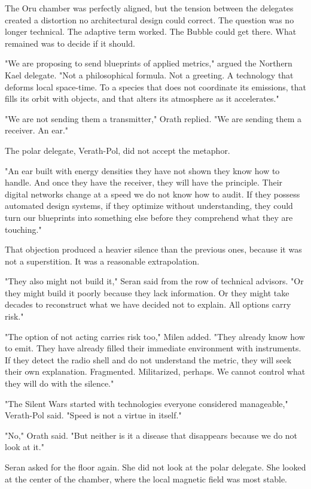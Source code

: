 \documentclass[11pt,a5paper,twoside]{book}
\begin{document}
The Oru chamber was perfectly aligned, but the tension between the delegates created a distortion no architectural design could correct. The question was no longer technical. The adaptive term worked. The Bubble could get there. What remained was to decide if it should.

"We are proposing to send blueprints of applied metrics," argued the Northern Kael delegate. "Not a philosophical formula. Not a greeting. A technology that deforms local space-time. To a species that does not coordinate its emissions, that fills its orbit with objects, and that alters its atmosphere as it accelerates."

"We are not sending them a transmitter," Orath replied. "We are sending them a receiver. An ear."

The polar delegate, Verath-Pol, did not accept the metaphor.

"An ear built with energy densities they have not shown they know how to handle. And once they have the receiver, they will have the principle. Their digital networks change at a speed we do not know how to audit. If they possess automated design systems, if they optimize without understanding, they could turn our blueprints into something else before they comprehend what they are touching."

That objection produced a heavier silence than the previous ones, because it was not a superstition. It was a reasonable extrapolation.

"They also might not build it," Seran said from the row of technical advisors. "Or they might build it poorly because they lack information. Or they might take decades to reconstruct what we have decided not to explain. All options carry risk."

"The option of not acting carries risk too," Milen added. "They already know how to emit. They have already filled their immediate environment with instruments. If they detect the radio shell and do not understand the metric, they will seek their own explanation. Fragmented. Militarized, perhaps. We cannot control what they will do with the silence."

"The Silent Wars started with technologies everyone considered manageable," Verath-Pol said. "Speed is not a virtue in itself."

"No," Orath said. "But neither is it a disease that disappears because we do not look at it."

Seran asked for the floor again. She did not look at the polar delegate. She looked at the center of the chamber, where the local magnetic field was most stable.
\end{document}
